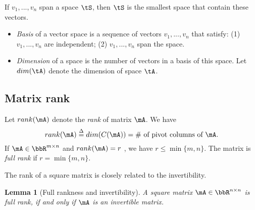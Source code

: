 \documentclass[11pt]{article}
\theoremstyle{plain}
\newtheorem{lem}{Lemma}
\theoremstyle{definition}
\begin{document}
If  $v_1 ,...,v_n$ span a space $\tS$, then $\tS$ is the smallest space that contain these vectors.

\begin{itemize}
	\item \textit{Basis} of a vector space is a sequence of vectors $v_1 ,...,v_n$ that satisfy: (1) $v_1 ,...,v_n$ are independent; (2) $v_1 ,...,v_n$ span the space.
	\item \textit{Dimension} of a space is the number of vectors in a basis of this space. Let $dim(\tA)$ denote the dimension of space $\tA$.
\end{itemize}

\subsection{Matrix rank}
Let $rank(\mA)$ denote the \textit{rank} of matrix $\mA$. We have
\begin{equation}\label{eq:rank}
	rank(\mA) \overset{\Delta}{=} dim(C(\mA)) = \# \text{ of pivot columns of }\mA .
\end{equation}
If $\mA\in \bbR^{m \times n}$ and $rank(\mA) = r$ , we have $r \leq \min\{m,n\} $. The  matrix is \textit{full rank} if $r = \min\{m,n\}$.

\vspace{.2cm}

The rank of a square matrix is closely related to the invertibility. 
\begin{lem}[Full rankness and invertibility]\label{lem:fullrank} A square matrix $\mA \in \bbR^{n \times n}$ is full rank, if and only if $\mA$ is an invertible matrix.
\end{lem}
\end{document}
